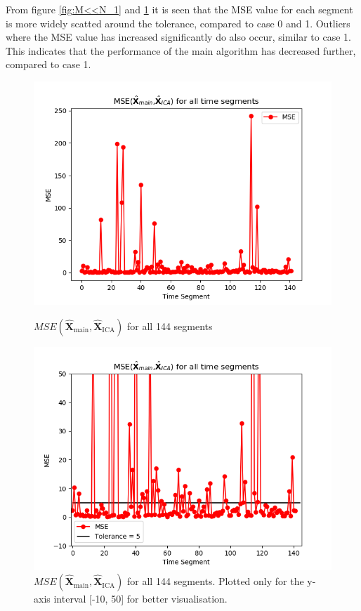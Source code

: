 From figure \ref{fig:M<<N_1} and \ref{fig:M<<N_1_2} it is seen that the MSE value for each segment is more widely scatted around the tolerance, compared to case 0 and 1. Outliers where the MSE value has increased significantly do also occur, similar to case 1. This indicates that the performance of the main algorithm has decreased further, compared to case 1. 

\begin{figure}[H]
\begin{widepage}
    \begin{minipage}[t]{.45\textwidth}
		\centering
		\includegraphics[width=1\linewidth]{figures/ch_7/resultat/average_mse_second_removed_ica}
	\caption{$MSE\left(\hat{\mathbf{X}}_{\text{main}},\hat{\mathbf{X}}_{\text{ICA}}\right)$ for all 144 segments}
	\label{fig:M<<N_1}
    \end{minipage} 
\hspace{0.5cm}
    \begin{minipage}[t]{.45\textwidth}
        \centering
		\includegraphics[width=1\linewidth]{figures/ch_7/resultat/average_mse_second_removed_ica_zoom.png}
	\caption{$MSE\left(\hat{\mathbf{X}}_{\text{main}},\hat{\mathbf{X}}_{\text{ICA}}\right)$ for all 144 segments. Plotted only for the y-axis interval [-10, 50] for better visualisation.}
	\label{fig:M<<N_1_2}
    \end{minipage}
\end{widepage}
\end{figure}

